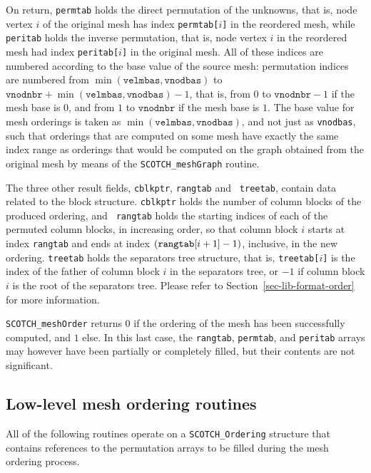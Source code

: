 \begin{itemize}
On return, {\tt permtab} holds the direct permutation of the unknowns,
that is, node vertex $i$ of the original mesh has index {\tt permtab[$i$]}
in the reordered mesh, while {\tt peritab} holds the inverse
permutation, that is, node vertex $i$ in the reordered mesh had index
{\tt peritab[$i$]} in the original mesh. All of these indices are numbered
according to the base value of the source mesh: permutation indices
are numbered from $\min(\mathtt{velmbas},\mathtt{vnodbas})$ to
$\mathtt{vnodnbr} + \min(\mathtt{velmbas},\mathtt{vnodbas}) -
1$, that is, from $0$ to $\mathtt{vnodnbr} - 1$ if the mesh base is
$0$, and from $1$ to $\mathtt{vnodnbr}$ if the mesh base is $1$.
The base value for mesh orderings is taken as
$\min(\mathtt{velmbas},\mathtt{vnodbas})$, and not just as
{\tt vnodbas}, such that orderings that are computed on some mesh
have exactly the same index range as orderings that would be computed
on the graph obtained from the original mesh by means of the
{\tt SCOTCH\_\lbt mesh\lbt Graph} routine.

The three other result fields, {\tt *cblkptr}, {\tt rangtab} and {\tt
treetab}, contain data related to the block structure. {\tt *cblkptr}
holds the number of column blocks of the produced ordering, and {\tt
rangtab} holds the starting indices of each of the permuted column
blocks, in increasing order, so that column block $i$ starts at index
{\tt rangtab\lbt [$i$]} and ends at index $(\mbox{\tt
rangtab}\lbt\mathtt{[}i + 1\mathtt{]} - 1)$, inclusive, in the new
ordering. {\tt treetab} holds the separators tree structure, that is,
{\tt treetab[$i$]} is the index of the father of column block $i$ in
the separators tree, or $-1$ if column block $i$ is the root of the
separators tree. Please refer to Section~\ref{sec-lib-format-order}
for more information.

\progret

{\tt SCOTCH\_meshOrder} returns $0$ if the ordering of the mesh has
been successfully computed, and $1$ else. In this last case, the
{\tt rangtab}, {\tt permtab}, and {\tt peritab} arrays may however have
been partially or completely filled, but their contents are not significant.
\end{itemize}

\subsection{Low-level mesh ordering routines}

All of the following routines operate on a {\tt SCOTCH\_\lbt Ordering}
structure that contains references to the permutation arrays to be
filled during the mesh ordering process.

